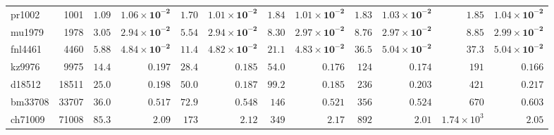 \begin{table}[t]
{\begin{tabular}{@{}lr*{5}{rr}@{}}
pr1002 & 1001 & $1.09$ & $\mathbf{1.06 \times 10^{-2}}$ & $1.70$ & $\mathbf{1.01 \times 10^{-2}}$ & $1.84$ & $\mathbf{1.01 \times 10^{-2}}$ & $1.83$ & $\mathbf{1.03 \times 10^{-2}}$ & $1.85$ & $\mathbf{1.04 \times 10^{-2}}$ \\
mu1979 & 1978 & $3.05$ & $\mathbf{2.94 \times 10^{-2}}$ & $5.54$ & $\mathbf{2.94 \times 10^{-2}}$ & $8.30$ & $\mathbf{2.97 \times 10^{-2}}$ & $8.76$ & $\mathbf{2.97 \times 10^{-2}}$ & $8.85$ & $\mathbf{2.99 \times 10^{-2}}$ \\
fnl4461 & 4460 & $5.88$ & $\mathbf{4.84 \times 10^{-2}}$ & $11.4$ & $\mathbf{4.82 \times 10^{-2}}$ & $21.1$ & $\mathbf{4.83 \times 10^{-2}}$ & $36.5$ & $\mathbf{5.04 \times 10^{-2}}$ & $37.3$ & $\mathbf{5.04 \times 10^{-2}}$ \\
kz9976 & 9975 & $14.4$ & $\mathbf{0.197}$ & $28.4$ & $\mathbf{0.185}$ & $54.0$ & $\mathbf{0.176}$ & $124$ & $\mathbf{0.174}$ & $191$ & $\mathbf{0.166}$ \\
d18512 & 18511 & $25.0$ & $\mathbf{0.198}$ & $50.0$ & $\mathbf{0.187}$ & $99.2$ & $\mathbf{0.185}$ & $236$ & $\mathbf{0.203}$ & $421$ & $\mathbf{0.217}$ \\
bm33708 & 33707 & $36.0$ & $\mathbf{0.517}$ & $72.9$ & $\mathbf{0.548}$ & $146$ & $\mathbf{0.521}$ & $356$ & $\mathbf{0.524}$ & $670$ & $\mathbf{0.603}$ \\
ch71009 & 71008 & $85.3$ & $\mathbf{2.09}$ & $173$ & $\mathbf{2.12}$ & $349$ & $\mathbf{2.17}$ & $892$ & $\mathbf{2.01}$ & $1.74 \times 10^{3}$ & $\mathbf{2.05}$ \\
\bottomrule
\end{tabular}%
}
\end{table}

\hardtimingtablebreak


